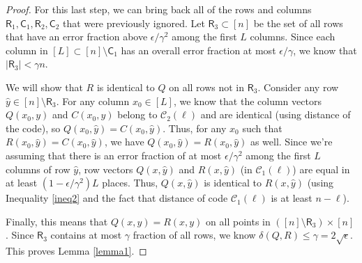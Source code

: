 \documentclass[10pt,a4paper]{amsart}
\newcommand{\Col}{\mathsf{C}}
\newcommand{\C}{\mathcal{C}}
\newcommand{\Row}{\mathsf{R}}
\begin{document}
\begin{proof}
For this last step, we can bring back all of the rows and columns $\Row_1, \Col_1, \Row_2, \Col_2$ that were previously ignored. Let $\Row_3 \subset [n]$ be the set of all rows that have an error fraction above $\epsilon/\gamma^2$ among the first $L$ columns. Since each column in $[L] \subset [n] \setminus \Col_1$ has an overall error fraction at most $\epsilon/\gamma$, we know that $|\Row_3| < \gamma n$.

We will show that $R$ is identical to $Q$ on all rows not in $\Row_3$. Consider any row $\hat y \in [n] \setminus \Row_3$. For any column $x_0 \in [L]$, we know that the column vectors $Q(x_0, y)$ and $C(x_0, y)$ belong to $\C_2(\ell)$ and are identical (using distance of the code), so $Q(x_0, \hat y) = C(x_0, \hat y)$. Thus, for any $x_0$ such that $R(x_0, \hat y) = C(x_0, \hat y)$, we have $Q(x_0, \hat y) = R(x_0, \hat y)$ as well. Since we're assuming that there is an error fraction of at most $\epsilon/\gamma^2$ among the first $L$ columns of row $\hat y$,  row vectors $Q(x, \hat y)$ and $R(x, \hat y)$ (in $\C_1(\ell)$) are equal in at least $(1-\epsilon/\gamma^2)L$ places. Thus, $Q(x, \hat y)$ is identical to $R(x, \hat y)$ (using Inequality \eqref{ineq2} and the fact that distance of code $\C_1(\ell)$ is at least $n-\ell$).

Finally, this means that $Q(x,y) = R(x,y)$ on all points in $([n] \setminus \Row_3) \times [n]$. Since $\Row_3$ contains at most $\gamma$ fraction of all rows, we know $\delta(Q, R) \leq \gamma = 2\sqrt{\epsilon}$. This proves Lemma \ref{lemma1}.
\end{proof}
\end{document}
